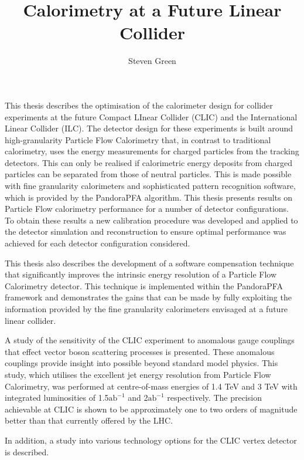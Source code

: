 \documentclass{article}
\begin{document}
\title{Calorimetry at a Future Linear Collider}
\author{Steven Green}
\date{}
\maketitle
\thispagestyle{empty}

This thesis describes the optimisation of the calorimeter design for collider experiments at the future Compact LInear Collider (CLIC) and the International Linear Collider (ILC).  The detector design for these experiments is built around high-granularity Particle Flow Calorimetry that, in contrast to traditional calorimetry, uses the energy measurements for charged particles from the tracking detectors.  This can only be realised if calorimetric energy deposits from charged particles can be separated from those of neutral particles.  This is made possible with fine granularity calorimeters and sophisticated pattern recognition software, which is provided by the PandoraPFA algorithm.  This thesis presents results on Particle Flow calorimetry performance for a number of detector configurations.  To obtain these results a new calibration procedure was developed and applied to the detector simulation and reconstruction to ensure optimal performance was achieved for each detector configuration considered.

This thesis also describes the development of a software compensation technique that significantly improves the intrinsic energy resolution of a Particle Flow Calorimetry detector. This technique is implemented within the PandoraPFA framework and demonstrates the gains that can be made by fully exploiting the information provided by the fine granularity calorimeters envisaged at a future linear collider.

A study of the sensitivity of the CLIC experiment to anomalous gauge couplings that effect vector boson scattering processes is presented. These anomalous couplings provide insight into possible beyond standard model physics. This study, which utilises the excellent jet energy resolution from Particle Flow Calorimetry, was performed at centre-of-mass energies of 1.4 TeV and 3 TeV with integrated luminosities of 1.5$\text{ab}^{-1}$ and 2$\text{ab}^{-1}$ respectively. The precision achievable at CLIC is shown to be approximately one to two orders of magnitude better than that currently offered by the LHC.

In addition, a study into various technology options for the CLIC vertex detector is described.
\end{document}
